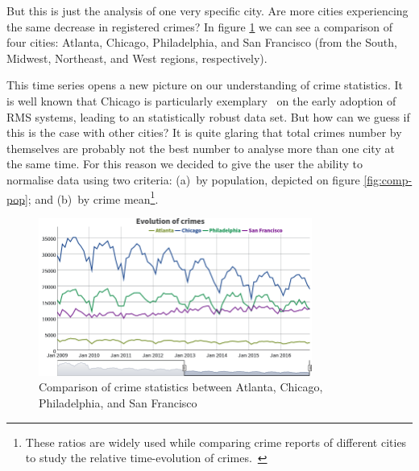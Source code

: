 But this is just the analysis of one very specific city. Are more cities experiencing the same decrease in registered crimes? In figure \ref{fig:comp-base} we can see a comparison of four cities: Atlanta, Chicago, Philadelphia, and San Francisco (from the South, Midwest, Northeast, and West regions, respectively).

This time series opens a new picture on our understanding of crime statistics. It is well known that Chicago is particularly exemplary~\cite{Beardsley2014} on the early adoption of RMS systems, leading to an statistically robust data set. But how can we guess if this is the case with other cities? It is quite glaring that total crimes number by themselves are probably not the best number to analyse more than one city at the same time. For this reason we decided to give the user the ability to normalise data using two criteria: (a)~by population, depicted on figure \ref{fig:comp-pop}; and (b)~by crime mean\footnote{These ratios are widely used while comparing crime reports of different cities to study the relative time-evolution of crimes.~\cite{Boba2004}}.

\begin{figure}[H]
	\centering
	\includegraphics[width=0.8\textwidth]{images/base}
	\caption{Comparison of crime statistics between Atlanta, Chicago, Philadelphia, and San Francisco}
	\label{fig:comp-base}
\end{figure}


